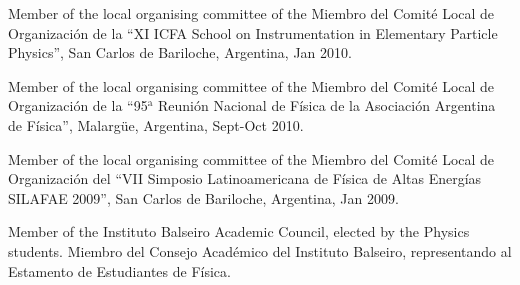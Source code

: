 \ifeng
Member of the local organising committee of the 
\else
Miembro del Comité Local de Organización de la 
\fi
``XI ICFA School on Instrumentation in Elementary Particle Physics'', San Carlos de Bariloche, Argentina, Jan 2010.

\ifeng
Member of the local organising committee of the 
\else
Miembro del Comité Local de Organización de la 
\fi
``95$^{\mathrm{a}}$ Reunión Nacional de Física de la Asociación Argentina de Física'', Malargüe, Argentina, Sept-Oct 2010.

\ifeng
Member of the local organising committee of the 
\else
Miembro del Comité Local de Organización del
\fi
``VII Simposio Latinoamericana de Física de Altas Energías SILAFAE 2009'', San Carlos de Bariloche, Argentina, Jan 2009.

\ifeng
Member of the Instituto Balseiro Academic Council, elected by the Physics students.
\else
Miembro del Consejo Académico del Instituto Balseiro, representando al Estamento de Estudiantes de Física.
\fi
